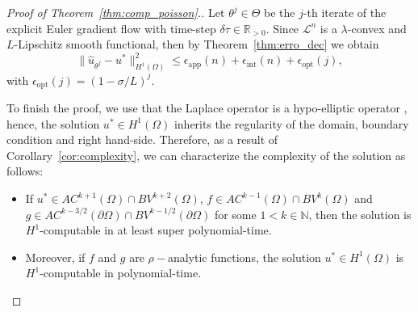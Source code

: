 \documentclass[pdflatex]{sn-jnl}%
\begin{document}
\begin{proof}[Proof of Theorem~\ref{thm:comp_poisson}.]


Let $\theta^j\in \Theta$ be the $j$-th iterate of the explicit Euler gradient flow with time-step $\delta\tau\in \mathbb{R}_{>0}$. Since $\mathcal{L}^n$ is a $\lambda$-convex and $L$-Lipschitz smooth functional, then by Theorem~\ref{thm:erro_dec} we obtain
\begin{equation}
    \|\hat{u}_{\theta^j}-u^*\|_{H^1(\Omega)}^2\leq \epsilon_\mathrm{app}(n)+\epsilon_\mathrm{int}(n)+\epsilon_\mathrm{opt}(j),
\end{equation}
with $\epsilon_\mathrm{opt}(j) = (1-\sigma/L)^{j}$.

To finish the proof, we use that the Laplace operator is a hypo-elliptic operator \cite{Mitrea2013-cl}, hence, the solution $u^*\in H^1(\Omega)$ inherits the regularity of the domain, boundary condition and right hand-side. Therefore, as a result of Corollary~\ref{cor:complexity}, we can characterize the complexity of the solution as follows:
\begin{itemize}
    \item If $u^*\in AC^{k+1}(\Omega)\cap BV^{k+2}(\Omega)$, $f\in  AC^{k-1}(\Omega)\cap BV^{k}(\Omega)$ and $g\in  AC^{k-3/2}(\partial\Omega)\cap BV^{k-1/2}(\partial\Omega)$ for some $1<k\in \mathbb{N}$, then the solution is $H^1$-computable in at least super polynomial-time. 
    \item Moreover, if $f$ and $g$ are $\rho-$analytic functions, the solution $u^*\in H^1(\Omega)$ is $H^1$-computable in polynomial-time. 
\end{itemize}
\end{proof}
\end{document}
